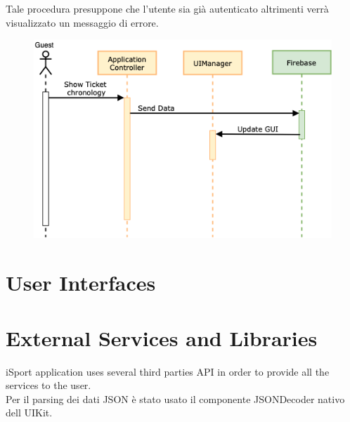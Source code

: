 \documentclass[numbers=noenddot, 12pt, a4paper, oneside]{scrbook}
\begin{document}
Tale procedura presuppone che l'utente sia già autenticato altrimenti verrà visualizzato un messaggio di errore.
\begin{figure}[H]
	\centering
	\includegraphics[width=1\textwidth]{images/Sequence/TicketChronology}
\end{figure}


\chapter{User Interfaces}
\chapter{External Services and Libraries}
iSport application uses several third parties API in order to provide all the services to the user.\\
Per il parsing dei dati JSON è stato usato il componente JSONDecoder nativo dell UIKit.
\end{document}
